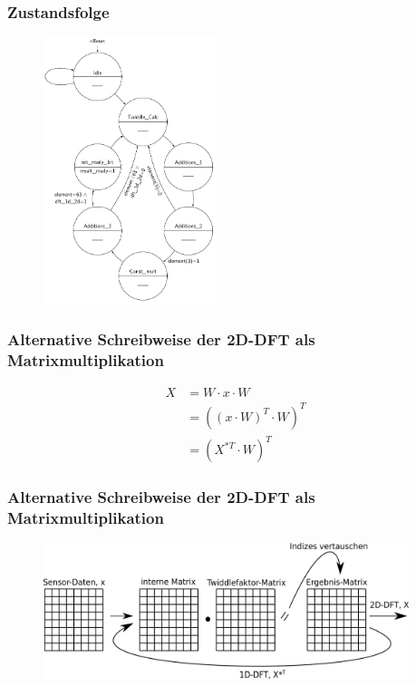 \begin{frame}\frametitle{Zustandsfolge}
 \begin{figure}
  \centering
  \includegraphics[width=0.45\textwidth]{img/Zustandsfolge.png}
 \end{figure}
\end{frame}


\begin{frame}\frametitle{Alternative Schreibweise der 2D-DFT als Matrixmultiplikation}
 \begin{align*}
 X &= W \cdot x \cdot W \nonumber \\
   &= \left(\left(x\cdot W\right)^T\cdot W\right)^T \label{eq:MatMultTranspose}\\
   &= \left(X^{*T} \cdot W\right)^T \nonumber
\end{align*}
\end{frame}


\begin{frame}\frametitle{Alternative Schreibweise der 2D-DFT als Matrixmultiplikation}
 \begin{figure}[htbp]
 \centering
 \includegraphics[width=0.95\textwidth]{img/MatMultTranspose2.png}
\end{figure}
\end{frame}


